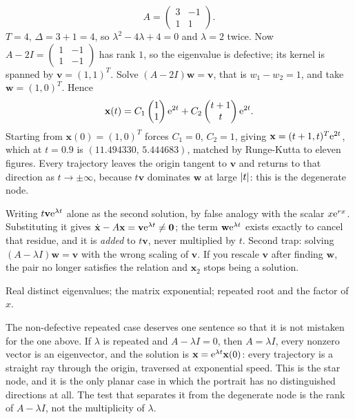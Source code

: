\begin{worked}
\[A=\begin{pmatrix}3&-1\\1&1\end{pmatrix}.\]
$T=4$, $\Delta=3+1=4$, so $\lambda^{2}-4\lambda+4=0$ and $\lambda=2$ twice. Now $A-2I=\begin{pmatrix}1&-1\\1&-1\end{pmatrix}$ has rank $1$, so the eigenvalue is defective; its kernel is spanned by $\mathbf{v}=(1,1)^{T}$. Solve $(A-2I)\mathbf{w}=\mathbf{v}$, that is $w_1-w_2=1$, and take $\mathbf{w}=(1,0)^{T}$. Hence
\[\mathbf{x}(t)=C_1\begin{pmatrix}1\\1\end{pmatrix}\mathrm{e}^{2t}+C_2\begin{pmatrix}t+1\\t\end{pmatrix}\mathrm{e}^{2t}.\]
Starting from $\mathbf{x}(0)=(1,0)^{T}$ forces $C_1=0$, $C_2=1$, giving $\mathbf{x}=(t+1,t)^{T}\mathrm{e}^{2t}$, which at $t=0.9$ is $(11.494330,\,5.444683)$, matched by Runge-Kutta to eleven figures. Every trajectory leaves the origin tangent to $\mathbf{v}$ and returns to that direction as $t\to\pm\infty$, because $t\mathbf{v}$ dominates $\mathbf{w}$ at large $\left\lvert t\right\rvert$: this is the degenerate node.
\end{worked}

\begin{trap}
Writing $t\mathbf{v}\mathrm{e}^{\lambda t}$ alone as the second solution, by false analogy with the scalar $x\mathrm{e}^{rx}$. Substituting it gives $\dot{\mathbf{x}}-A\mathbf{x}=\mathbf{v}\mathrm{e}^{\lambda t}\ne\mathbf{0}$; the term $\mathbf{w}\mathrm{e}^{\lambda t}$ exists exactly to cancel that residue, and it is \emph{added} to $t\mathbf{v}$, never multiplied by $t$. Second trap: solving $(A-\lambda I)\mathbf{w}=\mathbf{v}$ with the wrong scaling of $\mathbf{v}$. If you rescale $\mathbf{v}$ after finding $\mathbf{w}$, the pair no longer satisfies the relation and $\mathbf{x}_2$ stops being a solution.
\end{trap}

\begin{seealsob}Real distinct eigenvalues; the matrix exponential; repeated root and the factor of $x$.\end{seealsob}

The non-defective repeated case deserves one sentence so that it is not mistaken for the one above. If $\lambda$ is repeated and $A-\lambda I=0$, then $A=\lambda I$, every nonzero vector is an eigenvector, and the solution is $\mathbf{x}=\mathrm{e}^{\lambda t}\mathbf{x}(0)$: every trajectory is a straight ray through the origin, traversed at exponential speed. This is the star node, and it is the only planar case in which the portrait has no distinguished directions at all. The test that separates it from the degenerate node is the rank of $A-\lambda I$, not the multiplicity of $\lambda$.

